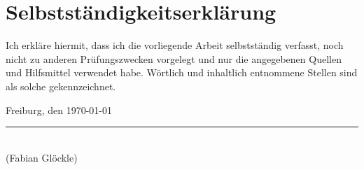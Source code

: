 
\chapter*{Selbstständigkeitserklärung}
\thispagestyle{empty}

Ich erkläre hiermit, dass ich die vorliegende Arbeit selbstständig verfasst, noch nicht zu anderen Prüfungszwecken vorgelegt und nur die angegebenen Quellen und Hilfsmittel verwendet habe. Wörtlich und inhaltlich entnommene Stellen sind als solche gekennzeichnet.

\vspace{1cm}
\noindent
Freiburg, den \today

\vspace{1.5cm}

\noindent\rule{.5\textwidth}{0.3mm}\\
\noindent
(Fabian Glöckle)
